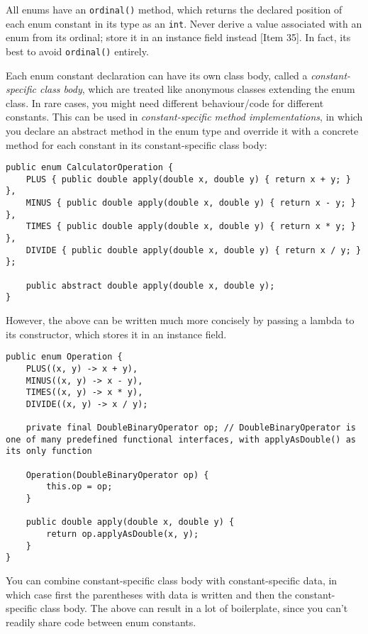 \documentclass[8pt, table, xcdraw]{article}%
\begin{document}
All enums have an \lstinline{ordinal()} method, which returns the declared position of each enum constant in its type as an \lstinline{int}. Never derive a value associated with an enum from its ordinal; store it in an instance field instead [Item 35]. In fact, its best to avoid \lstinline{ordinal()} entirely.

Each enum constant declaration can have its own class body, called a \emph{constant-specific class body}, which are treated like anonymous classes extending the enum class. In rare cases, you might need different behaviour/code for different constants. This can be used in \emph{constant-specific method implementations}, in which you declare an abstract method in the enum type and override it with a concrete method for each constant in its constant-specific class body:

\begin{lstlisting}
public enum CalculatorOperation {
    PLUS { public double apply(double x, double y) { return x + y; } },
    MINUS { public double apply(double x, double y) { return x - y; } },
    TIMES { public double apply(double x, double y) { return x * y; } },
    DIVIDE { public double apply(double x, double y) { return x / y; } };
    
    public abstract double apply(double x, double y);
}
\end{lstlisting}

However, the above can be written much more concisely by passing a lambda to its constructor, which stores it in an instance field.

\begin{lstlisting}
public enum Operation {
    PLUS((x, y) -> x + y),
    MINUS((x, y) -> x - y),
    TIMES((x, y) -> x * y),
    DIVIDE((x, y) -> x / y);
    
    private final DoubleBinaryOperator op; // DoubleBinaryOperator is one of many predefined functional interfaces, with applyAsDouble() as its only function
    
    Operation(DoubleBinaryOperator op) {
        this.op = op;
    }
    
    public double apply(double x, double y) {
        return op.applyAsDouble(x, y);
    }
}
\end{lstlisting}

You can combine constant-specific class body with constant-specific data, in which case first the parentheses with data is written and then the constant-specific class body. The above can result in a lot of boilerplate, since you can't readily share code between enum constants.
\end{document}
